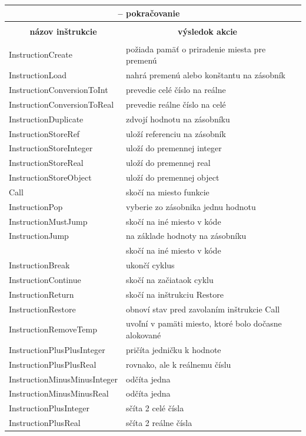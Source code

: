 \begin{center}
\begin{longtable}{|l|l|l|}
\multicolumn{2}{c}{{\tablename} \thetable{} -- pokračovanie} \\[0.5ex]
\hline \hline \\[-2ex]
\multicolumn{1}{c}{\textbf{názov inštrukcie}} &
\multicolumn{1}{c}{\textbf{výsledok akcie}} \\[0.5ex]\hline
\\[-1.8ex]
\endhead
InstructionCreate& požiada pamäť o priradenie miesta pre premenú \\
InstructionLoad& nahrá premenú alebo konštantu na zásobník \\
InstructionConversionToInt& prevedie celé číslo na reálne\\
InstructionConversionToReal& prevedie reálne číslo na celé\\
InstructionDuplicate& zdvojí hodnotu na zásobníku\\
InstructionStoreRef& uloží referenciu na zásobník \\
InstructionStoreInteger& uloží do premennej integer \\
InstructionStoreReal& uloží do premennej real\\
InstructionStoreObject& uloží do premennej object\\
Call&  skočí na miesto funkcie \\
InstructionPop& vyberie zo zásobnika jednu hodnotu\\
InstructionMustJump& skočí na iné miesto v kóde\\
InstructionJump& na základe hodnoty na zásobníku \\
&skočí na iné miesto v kóde \\
InstructionBreak& ukončí cyklus \\
InstructionContinue& skočí na začiataok cyklu\\
InstructionReturn& skočí na inštrukciu Restore\\
InstructionRestore& obnoví stav pred zavolaním inštrukcie Call\\
InstructionRemoveTemp& uvoľní v pamäti miesto, ktoré bolo dočasne alokované\\
InstructionPlusPlusInteger& pričíta jedničku k hodnote\\
InstructionPlusPlusReal& rovnako, ale k reálnemu číslu\\
InstructionMinusMinusInteger& odčíta jedna\\
InstructionMinusMinusReal& odčíta jedna\\
InstructionPlusInteger& sčíta 2 celé čísla\\
InstructionPlusReal& sčíta 2 reálne čísla\\

\end{longtable}
\end{center}
